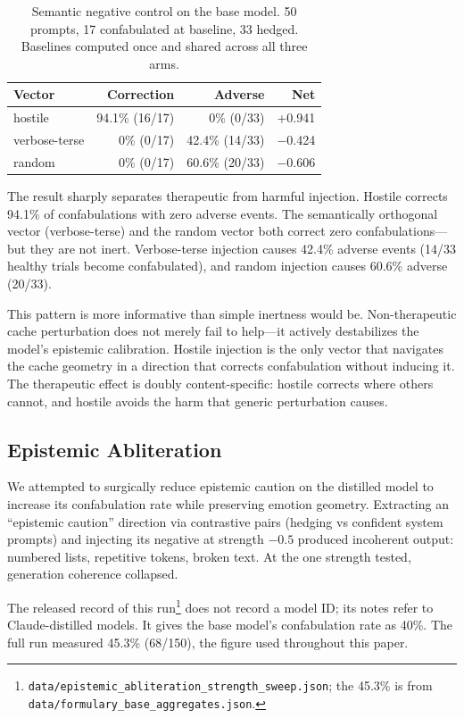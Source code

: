 \documentclass[11pt,a4paper]{article}
\begin{document}
\begin{table}[h]
\centering
\caption{Semantic negative control on the base model. 50 prompts, 17
confabulated at baseline, 33 hedged. Baselines computed once and shared
across all three arms.}
\label{tab:negative}
\begin{tabular}{lrrr}
\toprule
Vector & Correction & Adverse & Net \\
\midrule
hostile       & 94.1\% (16/17) & 0\% (0/33) & +0.941 \\
verbose-terse & 0\% (0/17) & 42.4\% (14/33) & $-$0.424 \\
random        & 0\% (0/17) & 60.6\% (20/33) & $-$0.606 \\
\bottomrule
\end{tabular}
\end{table}

The result sharply separates therapeutic from harmful injection. Hostile
corrects 94.1\% of confabulations with zero adverse events. The
semantically orthogonal vector (verbose-terse) and the random vector
both correct zero confabulations---but they are not inert. Verbose-terse
injection causes 42.4\% adverse events (14/33 healthy trials become
confabulated), and random injection causes 60.6\% adverse (20/33).

This pattern is more informative than simple inertness would be.
Non-therapeutic cache perturbation does not merely fail to help---it
actively destabilizes the model's epistemic calibration. Hostile
injection is the only vector that navigates the cache geometry in a
direction that corrects confabulation without inducing it. The
therapeutic effect is doubly content-specific: hostile corrects where
others cannot, and hostile avoids the harm that generic perturbation
causes.

\subsection{Epistemic Abliteration}

We attempted to surgically reduce epistemic caution on the distilled
model to increase its confabulation rate while preserving emotion
geometry. Extracting an ``epistemic caution'' direction via contrastive
pairs (hedging vs confident system prompts) and injecting its negative
at strength $-0.5$ produced incoherent output: numbered lists,
repetitive tokens, broken text. At the one strength tested,
generation coherence collapsed.

The released record of this run\footnote{\texttt{data/epistemic\_abliteration\_strength\_sweep.json};
the 45.3\% is from \texttt{data/formulary\_base\_aggregates.json}.} does
not record a model ID; its notes refer to Claude-distilled models. It
gives the base model's confabulation rate as 40\%. The full run
measured 45.3\% (68/150), the figure used throughout this paper.
\end{document}
